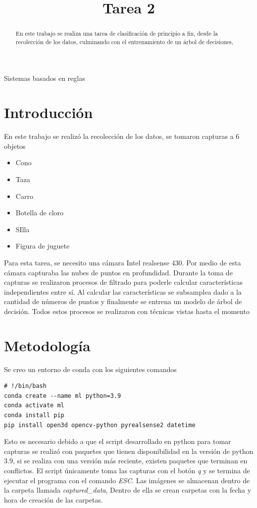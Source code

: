 \documentclass[conference]{IEEEtran}
\begin{document}
\title{Tarea 2}

\author{
}
\maketitle
\begin{abstract}
En este trabajo se realiza una tarea de clasificación de principio a fin, desde la recolección de los datos, culminando con el entrenamiento de un árbol de decisiones,
\end{abstract}
\begin{IEEEkeywords}
Sistemas basados en reglas
\end{IEEEkeywords}
\section{Introducción}
En este trabajo se realizó la recolección de los datos, se tomaron capturas a 6 objetos
\begin{itemize}
    \item Cono
    \item Taza
    \item Carro
    \item Botella de cloro
    \item SIlla
    \item Figura de juguete
\end{itemize}
Para esta tarea, se necesito una cámara Intel realsense 430. Por medio de esta cámara capturaba las nubes de puntos en profundidad. Durante la toma de capturas se realizaron procesos de filtrado para poderle calcular características independientes entre sí. Al calcular las características se subsamplea dado a la cantidad de números de puntos y finalmente se entrena un modelo de árbol de decisión. Todos estos procesos se realizaron con técnicas vistas hasta el momento
\section{Metodología}
Se creo un entorno de conda con los siguientes comandos
\begin{verbatim}
# !/bin/bash
conda create --name ml python=3.9
conda activate ml
conda install pip
pip install open3d opencv-python pyrealsense2 datetime
\end{verbatim}
Esto es necesario debido a que el script desarrollado en python para tomar capturas se realizó con paquetes que tienen disponibilidad en la versión de python 3.9, si se realiza con una versión más reciente, existen paquetes que terminan en conflictos. El script únicamente toma las capturas con el botón \textit{q} y se termina de ejecutar el programa con el comando \textit{ESC}. Las imágenes se almacenan dentro de la carpeta llamada \textit{captured_data}, Dentro de ella se crean carpetas con la fecha y hora de creación de las carpetas.
\end{document}
